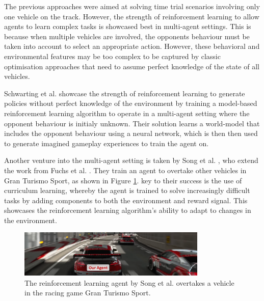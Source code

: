 The previous approaches were aimed at solving time trial scenarios involving only one vehicle on the track.
However, the strength of reinforcement learning to allow agents to learn complex tasks is showcased best in multi-agent settings.
This is because when multiple vehicles are involved, the opponents behaviour must be taken into account to select an appropriate action.
However, these behavioral and environmental features may be too complex to be captured by classic optimisation approaches that need to assume perfect knowledge of the state of all vehicles.

Schwarting et al. \cite{Schwarting2021} showcase the strength of reinforcement learning to generate policies without perfect knowledge of the environment by training a model-based reinforcement learning algorithm to operate in a multi-agent setting where the opponent behaviour is initialy unknown.
Their solution learns a world-model that includes the opponent behaviour using a neural network, which is then then used to generate imagined gameplay experiences to train the agent on.

Another venture into the multi-agent setting is taken by Song et al. \cite{Song2021}, who extend the work from Fuchs et al. \cite{Fuchs2021}. 
They train an agent to overtake other vehicles in Gran Turismo Sport, as shown in Figure \ref{fig:RL_gran_turismo}.
key to their success is the use of curriculum learning, whereby the agent is trained to solve increasingly difficult tasks by adding components to both the environment and reward signal. 
This showcases the reinforcement learning algorithm's ability to adapt to changes in the environment.

\begin{figure}[htb!]
    \centering
    \includegraphics[width=0.8\textwidth]{contents/chapt2/figs/RL_gran_turismo.png}
    \caption[A reinforcement learning agent overtakes a vehicle in the racing game Gran Turismo Sport]{The reinforcement learning agent by Song et al. \cite{Song2021} overtakes a vehicle in the racing game Gran Turismo Sport.}
    \label{fig:RL_gran_turismo}
\end{figure}




